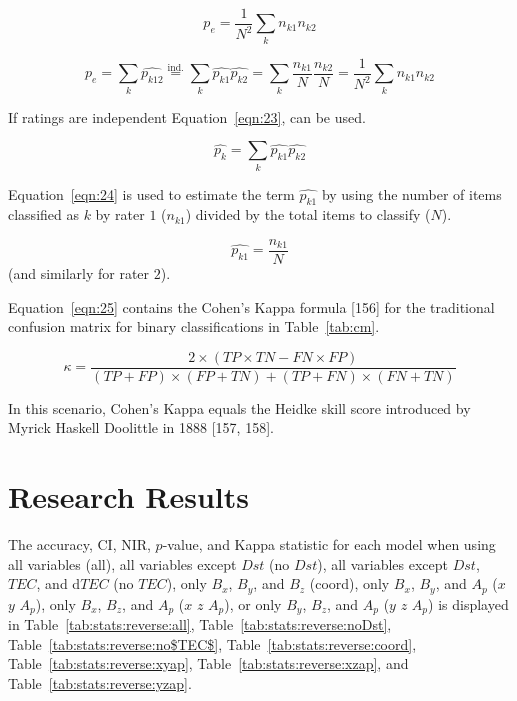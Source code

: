 \documentclass[sn-mathphys-num]{sn-jnl}%
\begin{document}
\begin{equation}
	p_{e}={\frac {1}{N^{2}}}\sum_{k}n_{k1}n_{k2}
	\label{eqn:21}
\end{equation}

\begin{equation}
	p_{e}=\sum_{k}{\widehat {p_{k12}}}{\overset{\text{ind.}}{=}}\sum_{k}{\widehat {p_{k1}}}{\widehat {p_{k2}}}=\sum_{k}{\frac {n_{k1}}{N}}{\frac {n_{k2}}{N}}={\frac {1}{N^{2}}}\sum_{k}n_{k1}n_{k2}
	\label{eqn:22}
\end{equation}

If ratings are independent Equation~\ref{eqn:23}, can be used.

\begin{equation}
	\textstyle{\widehat{p_{k}}}=\sum_{k}{\widehat{p_{k1}}}{\widehat {p_{k2}}}
	\label{eqn:23}
\end{equation}

Equation~\ref{eqn:24} is used to estimate the term $\widehat{p_{k1}}$ by using the number of items classified as $k$ by rater $1$ ($n_{k1}$) divided by the total items to classify ($N$).

\begin{equation}
	\widehat {p_{k1}}=\frac{n_{k1}}{N}
	\label{eqn:24}
\end{equation}
 (and similarly for rater $2$).
 
Equation~\ref{eqn:25} contains the Cohen's Kappa formula [156] for the traditional confusion matrix for binary classifications in Table~\ref{tab:cm}.

\begin{equation}
	\kappa ={\frac{2\times (TP\times TN-FN\times FP)}{(TP+FP)\times (FP+TN)+(TP+FN)\times (FN+TN)}}
	\label{eqn:25}
\end{equation}

In this scenario, Cohen's Kappa equals the Heidke skill score introduced by Myrick Haskell Doolittle in 1888 [157, 158].

\section{Research Results}
\label{sec:Results}

The accuracy, CI, NIR, $p$-value, and Kappa statistic for each model when using all variables (all), all variables except $Dst$ (no $Dst$), all variables except $Dst$, $TEC$, and d$TEC$ (no $TEC$), only $B_{x}$, $B_{y}$, and $B_{z}$ (coord), only $B_{x}$, $B_{y}$, and $A_{p}$ ($x$ $y$ $A_{p}$), only $B_{x}$, $B_{z}$, and $A_{p}$ ($x$ $z$ $A_{p}$), or only $B_{y}$, $B_{z}$, and $A_{p}$ ($y$ $z$ $A_{p}$) is displayed in Table~\ref{tab:stats:reverse:all}, Table~\ref{tab:stats:reverse:noDst}, Table~\ref{tab:stats:reverse:no$TEC$}, Table~\ref{tab:stats:reverse:coord}, Table~\ref{tab:stats:reverse:xyap}, Table~\ref{tab:stats:reverse:xzap}, and Table~\ref{tab:stats:reverse:yzap}.
\end{document}
